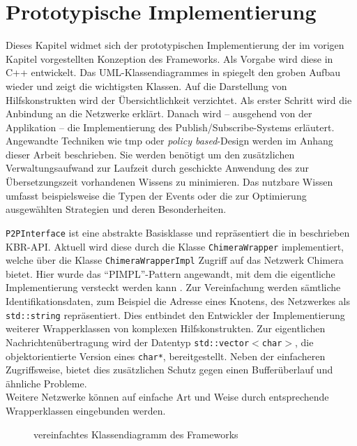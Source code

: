 \chapter{Prototypische Implementierung}
\label{chap:impl}
Dieses Kapitel widmet sich der prototypischen Implementierung der im vorigen Kapitel vorgestellten Konzeption des Frameworks. Als Vorgabe wird diese in  C++ entwickelt. Das UML-Klassendiagrammes in  spiegelt den groben Aufbau wieder und zeigt die wichtigsten Klassen. Auf die Darstellung von Hilfskonstrukten wird der Übersichtlichkeit verzichtet. Als erster Schritt wird die Anbindung an die Netzwerke erklärt. Danach wird -- ausgehend von der Applikation -- die Implementierung des Publish/Subscribe-Systems erläutert. Angewandte Techniken wie \ac{tmp} oder \emph{policy based}-Design werden im Anhang dieser Arbeit beschrieben. Sie werden benötigt um den zusätzlichen Verwaltungsaufwand zur Laufzeit durch geschickte Anwendung des zur Übersetzungszeit vorhandenen Wissens zu minimieren. Das nutzbare Wissen umfasst beispielsweise die Typen der Events oder die zur Optimierung ausgewählten Strategien und deren Besonderheiten.

\texttt{P2PInterface} ist eine abstrakte Basisklasse und repräsentiert die in \cite{Dabek2003Towards} beschrieben KBR-API. Aktuell wird diese durch die Klasse \texttt{ChimeraWrapper} implementiert, welche über die Klasse \texttt{ChimeraWrapperImpl} Zugriff auf das Netzwerk Chimera bietet. Hier wurde das ``PIMPL''-Pattern angewandt, mit dem die eigentliche Implementierung versteckt werden kann \cite{Alexandrescu2001Modern}. Zur Vereinfachung werden sämtliche Identifikationsdaten, zum Beispiel die Adresse eines Knotens, des Netzwerkes als \texttt{std::string} repräsentiert. Dies entbindet den Entwickler der Implementierung weiterer Wrapperklassen von komplexen Hilfskonstrukten. Zur eigentlichen Nachrichtenübertragung wird der Datentyp \texttt{std::vector$<$char$>$}, die objektorientierte Version eines \texttt{char*}, bereitgestellt. Neben der einfacheren Zugriffsweise, bietet dies zusätzlichen Schutz gegen einen Bufferüberlauf und ähnliche Probleme.\\
Weitere Netzwerke können auf einfache Art und Weise durch entsprechende Wrapperklassen eingebunden werden.

\begin{figure}[htbp]
\centering
{}
\caption{vereinfachtes Klassendiagramm des Frameworks}
\label{fig:uml}
\end{figure}

